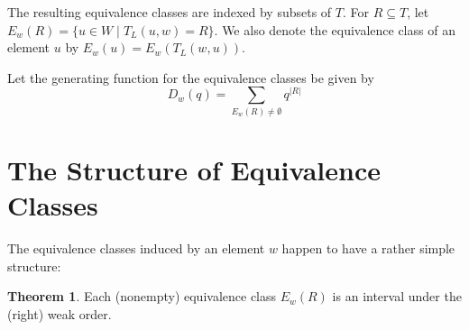 \documentclass[11pt]{article}
\theoremstyle{definition}
\theoremstyle{definition}
\newtheorem{theorem}{Theorem}
\begin{document}
The resulting equivalence classes are indexed by subsets of $T$. For $R \subseteq T$, let $E_w(R) = \{u \in W \mid T_L(u, w) = R\}$. We also denote the equivalence class of an element $u$ by $E_w(u) = E_w(T_L(w, u))$.

Let the generating function for the equivalence classes be given by
\[
D_w(q) = \sum_{E_w(R) \neq \emptyset} q^{|R|}
\]

\section{The Structure of Equivalence Classes}
The equivalence classes induced by an element $w$ happen to have a rather simple structure:

\begin{theorem}
Each (nonempty) equivalence class $E_w(R)$ is an interval under the (right) weak order.
\end{theorem}
\end{document}
